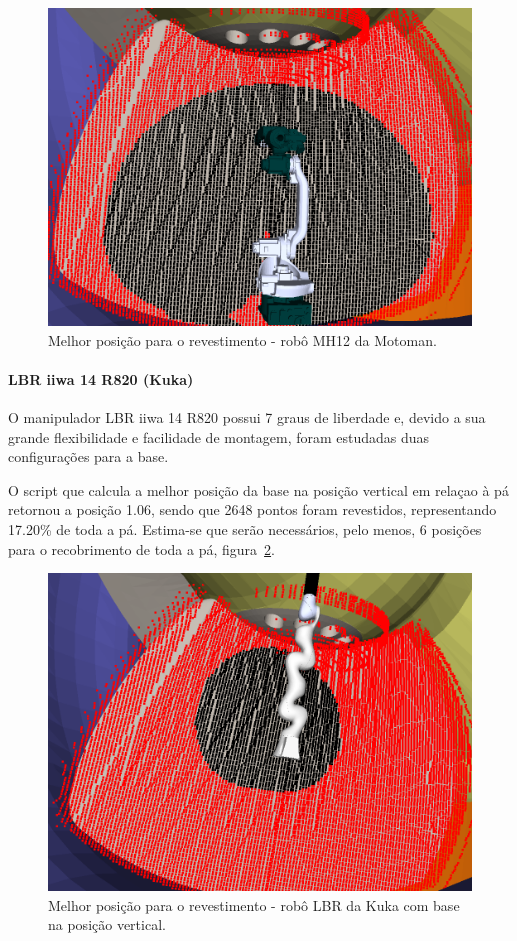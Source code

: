 \begin{figure}[h!]	
	\includegraphics[width=\columnwidth]{figs/bighatch/mh12_bestpos.png}
	\caption{Melhor posição para o revestimento - robô MH12 da Motoman.}
	\label{fig::mh12bestpos}
\end{figure}


\paragraph{LBR iiwa 14 R820 (Kuka)}
O manipulador LBR iiwa 14 R820 possui 7 graus de liberdade e, devido a sua
grande flexibilidade e facilidade de montagem, foram estudadas duas
configurações para a base.

O script que calcula a melhor posição da base na posição vertical em relaçao à
pá retornou a posição 1.06, sendo que 2648 pontos foram revestidos,
representando 17.20\% de toda a pá. Estima-se que serão necessários, pelo menos,
6 posições para o recobrimento de toda a pá, figura~\ref{fig::lbrbestposv}.

\begin{figure}[h!]	
	\includegraphics[width=\columnwidth]{figs/bighatch/lbr_bestposv.png}
	\caption{Melhor posição para o revestimento - robô LBR da Kuka com base na
	posição vertical.}
	\label{fig::lbrbestposv}
\end{figure}

